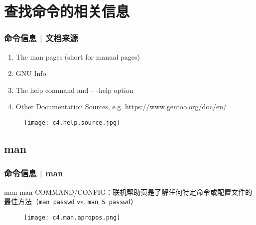 \section{查找命令的相关信息}
\begin{frame}
  \frametitle{命令信息 | 文档来源}
  \begin{enumerate}
    \item The man pages (short for manual pages)
    \item GNU Info
    \item The help command and -\ -help option
    \item Other Documentation Sources, e.g. \href{https://www.gentoo.org/doc/en/}{https://www.gentoo.org/doc/en/}
  \end{enumerate}
  \begin{figure}
    \centering
    \texttt{[image: c4.help.source.jpg]}
  \end{figure}
\end{frame}

\subsection{man}
\begin{frame}[fragile]
  \frametitle{命令信息 | man}
  \begin{block}{man}
    \alert{man COMMAND/CONFIG}：联机帮助页是了解任何特定命令或配置文件的最佳方法（\verb|man passwd| vs. \verb|man 5 passwd|）
  \end{block}
  \begin{figure}
    \centering
    \texttt{[image: c4.man.apropos.png]}
  \end{figure}
\end{frame}

